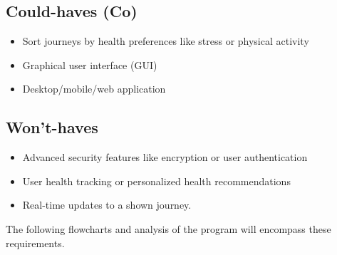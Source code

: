 \subsection{Could-haves (Co)}\label{subsec:could-haves}

\begin{itemize}
    \item Sort journeys by health preferences like stress or physical activity
    \item Graphical user interface (GUI)
    \item Desktop/mobile/web application
\end{itemize}
\subsection{Won't-haves}\label{subsec:wont-haves}

\begin{itemize}
    \item Advanced security features like encryption or user authentication
    \item User health tracking or personalized health recommendations
    \item Real-time updates to a shown journey.
\end{itemize}

The following flowcharts and analysis of the program will encompass these requirements.

